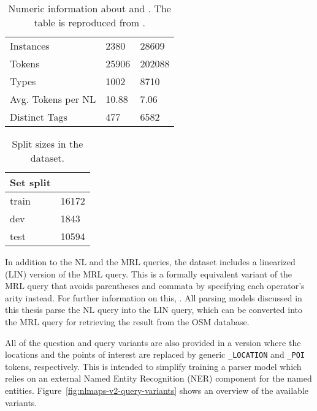 \begin{table}[ht!]
  \centering
  \begin{tabular}[h]{lll}
    \toprule
    & \nlmapsone{} & \nlmapstwo{}\\
    \midrule
    Instances & \num{2380} & \num{28609}\\
    Tokens & \num{25906} & \num{202088}\\
    Types & \num{1002} & \num{8710}\\
    Avg. Tokens per NL & \num{10.88} & \num{7.06}\\
    Distinct Tags & \num{477} & \num{6582}\\
    \bottomrule
  \end{tabular}
  \caption[\nlmapstwo{} statistics]{Numeric information about \nlmapsone{} and
    \nlmapstwo{}. The table is reproduced from \textcite{lawrence-2018}.}
  \label{tab:nlmaps-v1-v2-stats}
\end{table}

\begin{table}[ht!]
  \centering
  \begin{tabular}[h]{ll}
    \toprule
    Set split & \nlmapstwo{}\\
    \midrule
    train & \num{16172}\\
    dev & \num{1843}\\
    test & \num{10594}\\
    \bottomrule
  \end{tabular}
  \caption[\nlmapstwo{} splits]{Split sizes in the \nlmapstwo{} dataset.}
  \label{tab:nlmapsv2-splits}
\end{table}

In addition to the NL and the MRL queries, the dataset includes a linearized
(LIN) version of the MRL query. This is a formally equivalent variant of the MRL
query that avoids parentheses and commata by specifying each operator’s arity
instead. For further information on this,
\textcites(cf.)(){andreas-2013}{haas-2016}. All parsing models discussed in this
thesis parse the NL query into the LIN query, which can be converted into the
MRL query for retrieving the result from the OSM database.

All of the question and query variants are also provided in a version where the
locations and the points of interest are replaced by generic
\lstinline!_LOCATION! and \lstinline!_POI! tokens, respectively. This is
intended to simplify training a parser model which relies on an external Named
Entity Recognition (NER) component for the named entities.
Figure~\ref{fig:nlmaps-v2-query-variants} shows an overview of the available
variants.

